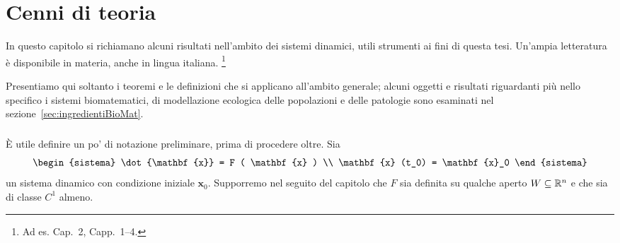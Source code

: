 %
%








\chapter{Cenni di teoria}
\label{chap:teoria}
In questo capitolo si richiamano alcuni risultati nell'ambito dei sistemi dinamici, utili strumenti ai fini
di questa tesi.
Un'ampia letteratura è disponibile in materia, anche in lingua italiana.
\footnote{Ad es. \cite{ricciSistDin} Cap.~2, \cite{introSD} Capp.~1--4.}

Presentiamo qui soltanto i teoremi e le definizioni che si applicano all'ambito generale; alcuni oggetti
e risultati riguardanti più nello specifico i sistemi biomatematici, di modellazione ecologica delle popolazioni
e delle patologie sono esaminati nel sezione~\ref{sec:ingredientiBioMat}.

\paragraph{}
È utile definire un po' di notazione preliminare, prima di procedere oltre.
Sia
$$\begin{sistema}
\dot{\mathbf{x}} = F ( \mathbf{x} ) \\
\mathbf{x} (t_0) = \mathbf{x}_0
\end{sistema}$$
un sistema dinamico con condizione iniziale $\mathbf{x}_0$. Supporremo nel seguito del capitolo che $F$ sia
definita su qualche aperto $W \subseteq \mathbb{R}^n$ e che sia di classe $C^1$ almeno.

